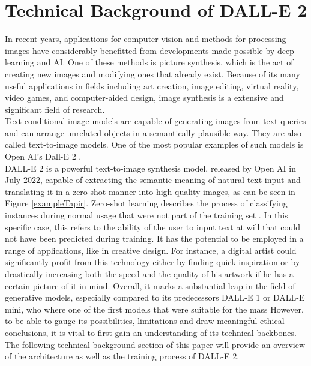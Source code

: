 \documentclass[9pt,twocolumn,twoside]{osajnl}
\begin{document}
\section{Technical Background of DALL-E 2}
In recent years, applications for computer vision and methods for processing images have considerably benefitted from developments made possible by deep learning and AI. 
One of these methods is picture synthesis, which is the act of creating new images and modifying ones that already exist. 
Because of its many useful applications in fields including art creation, image editing, virtual reality, video games, and computer-aided design, image synthesis is a extensive and significant field of research.\\
Text-conditional image models are capable of generating images from text queries and can arrange unrelated objects in a semantically plausible way. They are also called text-to-image models.
One of the most popular examples of such models is Open AI's Dall-E 2 \cite{DallE}.\\ 
DALL-E 2 is a powerful text-to-image synthesis model, released by Open AI in July 2022, capable of extracting the semantic meaning of natural text input and translating it in a zero-shot manner \cite{zeroShot} into high quality images, as can be seen in Figure \ref{exampleTapir}.
Zero-shot learning describes the process of classifying instances during normal usage that were not part of the training set \cite{mfdp}.
In this specific case, this refers to the ability of the user to input text at will that could not have been predicted during training.
It has the potential to be employed in a range of applications, like in creative design. For instance, a digital artist could significantly profit from this technology either by 
finding quick inspiration or by drastically increasing both the speed and the quality of his artwork if he has a certain picture of it in mind.
Overall, it marks a substantial leap in the field of generative models, especially compared to its predecessors DALL-E 1 or DALL-E mini, who where one of the first models that were suitable for the mass\cite{}%
However, to be able to gauge its possibilities, limitations and draw meaningful ethical conclusions, it is vital to first gain an understanding of its technical backbones.
The following technical background section of this paper will provide an overview of the architecture as well as the training process of DALL-E 2. 
\end{document}
